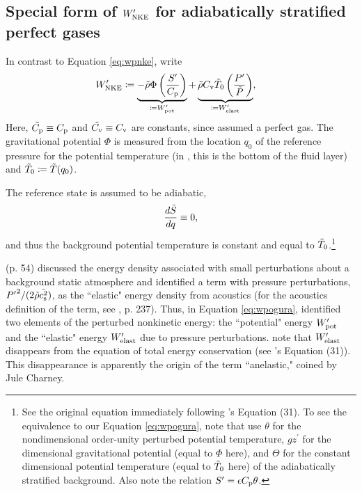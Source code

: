 \documentclass[12pt]{article}
\newcommand{\wpnke}{W^\prime_{\rm NKE}}
\newcommand{\wppot}{W^\prime_{\rm pot}}
\newcommand{\wpelast}{W^\prime_{\rm elast}}
\begin{document}
\subsection{Special form  of $\wpnke$ for adiabatically stratified perfect gases}
In contrast to Equation \eqref{eq:wpnke}, \citet{Ogura1962} write
\begin{align}\label{eq:wpogura}
	\wpnke &\define \underbrace{-\rhotilde\Phi\left(\frac{\entrprime}{\cpcap}\right)}_{\define \wppot} +  \underbrace{\rhotilde\cvcap\tmptilde_0\left(\frac{\prsprime}{\prstilde}\right)}_{\define \wpelast},
\end{align}
Here, $\tilde{C_{\rm{p}}}\equiv C_{\rm{p}}$ and $\tilde{C_{\rm{v}}}\equiv C_{\rm{v}}$ are constants, since \citet{Ogura1962} assumed a perfect gas. The gravitational potential $\Phi$ is measured from the location $q_0$ of the reference pressure for the potential temperature (in \citealt{Ogura1962}, this is the bottom of the fluid layer) and $\tilde{T}_0\coloneqq \tilde{T}(q_0)$. 

The reference state is assumed to be adiabatic,
\begin{align}\label{eq:refadiabatic}
	\frac{d\tilde{S}}{dq}\equiv0,
\end{align}
and thus the background potential temperature is constant and equal to $\tilde{T}_0$.\footnote{See the original equation immediately following \citet{Ogura1962}'s Equation (31). To see the equivalence to our Equation \eqref{eq:wpogura}, note that \citet{Ogura1962} use $\theta$ for the nondimensional order-unity perturbed potential temperature, $gz^\prime$ for the dimensional gravitational potential (equal to $\Phi$ here), and $\Theta$ for the constant dimensional potential temperature (equal to $\tilde{T}_0$ here) of the adiabatically stratified background. Also note the relation ${S^\prime}=\epsilon C_{\rm{p}}\theta$.}

 \citealt{Eckart1960} (p. 54) discussed the energy density associated with small perturbations about a background static atmosphere and identified a term with pressure perturbations, ${P^\prime}^2/(2\tilde{\rho}\tilde{c_{\rm s}^2})$, as the ``elastic" energy density from acoustics (for the acoustics definition of the term, see \citealt{Morse1948}, p. 237). Thus, in Equation \eqref{eq:wpogura}, \citet{Ogura1962} identified two elements of the perturbed nonkinetic energy: the ``potential" energy $\wppot$ and the ``elastic" energy $\wpelast$ due to pressure perturbations. \citet{Ogura1962} note that $\wpelast$ disappears from the equation of total energy conservation (see \citealt{Ogura1962}'s Equation (31)). This disappearance is apparently the origin of the term ``anelastic," coined by Jule Charney.%
\end{document}
